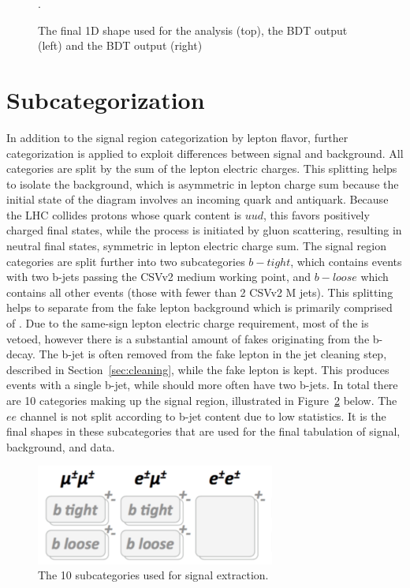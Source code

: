 \begin{figure}[htp]
\caption[Data to MC comparison of final shapes]{The final 1D shape used for the analysis (top), the \ttbar BDT output (left) and the \ttv BDT output (right)}.
\label{fig:final_shapes_prefit}
\end{figure}


\section{Subcategorization}
In addition to the signal region categorization by lepton flavor, further categorization is applied to exploit differences between signal and background. All categories are
split by the sum of the lepton electric charges. This splitting helps to isolate the \ttw background, which is asymmetric in lepton charge sum because the initial state of the
diagram involves an incoming quark and antiquark. Because the LHC collides protons whose quark content is $uud$, this favors positively charged final states, while the \tth process
is initiated by gluon scattering, resulting in neutral final states, symmetric in lepton electric charge sum.
The signal region categories
are split further into two subcategories $b-tight$, which contains events with two b-jets passing the CSVv2 medium working point, and $b-loose$ which contains all other events
(those with fewer than 2 CSVv2 M jets). This splitting helps to separate \tth from the fake lepton background which is primarily comprised of \ttbar. Due to the same-sign 
lepton electric charge requirement, most of the \ttbar is vetoed, however there is a substantial amount of fakes originating from the b-decay. The b-jet is often removed
from the fake lepton in the jet cleaning step, described in Section~\ref{sec:cleaning}, while the fake lepton is kept. This produces events with a single b-jet, while \tth should more often have two b-jets. In total there are 10 categories
making up the signal region, illustrated in Figure~\ref{fig:subcats} below. The $ee$ channel is not split according to b-jet content due to low statistics. 
It is the final shapes in these subcategories that are used for the final tabulation of signal, background, and data. 

\begin{figure}[htp]
\centering
\includegraphics[width=0.7\textwidth]{ch9_figs/subcats.pdf}
\caption[Sub categories used for signal extraction]{The 10 subcategories used for signal extraction.}
\label{fig:subcats}
\end{figure}



